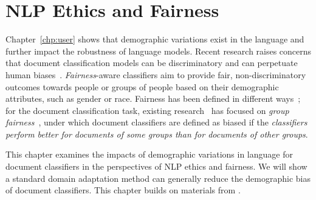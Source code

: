 \chapter{NLP Ethics and Fairness}
\label{chp:fairness}

Chapter~\ref{chp:user} shows that demographic variations exist in the language and further impact the robustness of language models.
Recent research raises concerns that document classification models can be discriminatory and can perpetuate human biases~\cite{dixon2018measuring, kiritchenko2018examining, park2018reducing, garg2019counterfactual, borkan2019nuanced}.
\textit{Fairness}-aware classifiers aim to provide fair, non-discriminatory outcomes towards people or groups of people based on their demographic attributes, such as gender or race. 
Fairness has been defined in different ways~\cite{hardt2016equality}; for the document classification task, existing research~\cite{dixon2018measuring, kiritchenko2018examining, park2018reducing, garg2019counterfactual, heindorf2019debiasing} has focused on \textit{group fairness}~\cite{chouldechova2018frontiers}, under which document classifiers are defined as biased if the \textit{classifiers perform better for documents of some groups than for documents of other groups}.

This chapter examines the impacts of demographic variations in language for document classifiers in the perspectives of NLP ethics and fairness.
We will show a standard domain adaptation method can generally reduce the demographic bias of document classifiers.
This chapter builds on materials from \cite{huang2020multilingual}.

